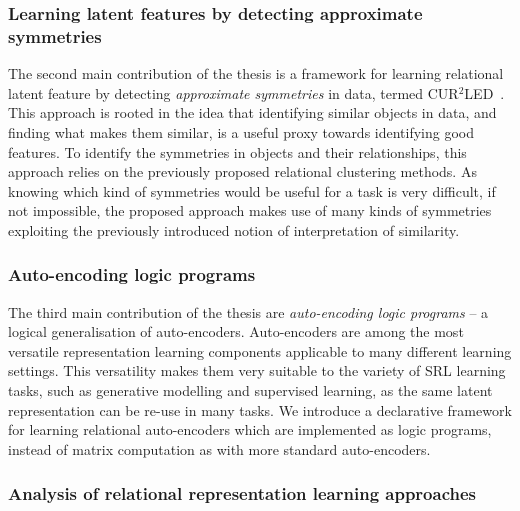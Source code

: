 \subsubsection{Learning latent features by detecting approximate symmetries}

The second main contribution of the thesis is a framework for learning relational latent feature by detecting \textit{approximate symmetries} in data, termed CUR$^2$LED~\cite{Dumancic2017}.
This approach is rooted in the idea that identifying similar objects in data, and finding what makes them similar, is a useful proxy towards identifying good features.
To identify the symmetries in objects and their relationships, this approach relies on the previously proposed relational clustering methods.
As knowing which kind of symmetries would be useful for a task is very difficult, if not impossible, the proposed approach makes use of many kinds of symmetries exploiting the previously introduced notion of interpretation of similarity.







\subsubsection{Auto-encoding logic programs}

The third main contribution of the thesis are \textit{auto-encoding logic programs} \cite{Dumancic2018a,AlpsSubmitted} -- a logical generalisation of auto-encoders.
Auto-encoders are among the most versatile representation learning components applicable to many different learning settings.
This versatility makes them very suitable to the variety of SRL learning tasks, such as generative modelling and supervised learning, as the same latent representation can be re-use in many tasks.
We introduce a declarative framework for learning relational auto-encoders which are implemented as logic programs, instead of matrix computation as with more standard auto-encoders.






\subsubsection{Analysis of relational representation learning approaches}

